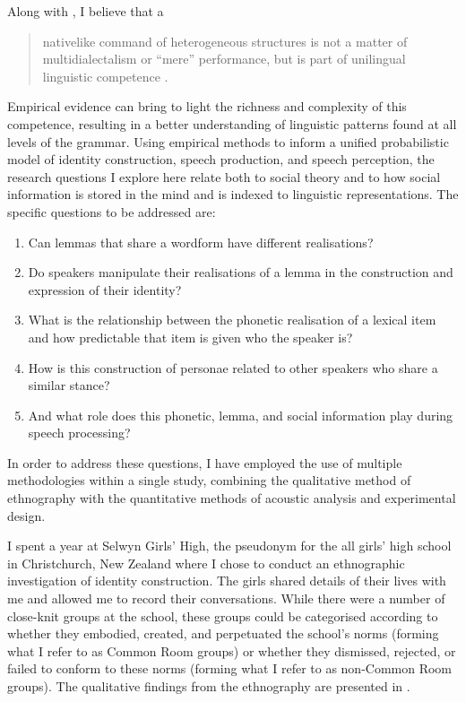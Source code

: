 Along with \citet{weinrichlabovherzog1968}, I believe that a

\begin{quote}
	nativelike command of heterogeneous structures is not a matter of multidialectalism or ``mere'' performance, but is part of unilingual linguistic competence \citep[101]{weinrichlabovherzog1968}.
\end{quote}

\noindent Empirical evidence can bring to light the richness and complexity of this competence, resulting in a better understanding of linguistic patterns found at all levels of the grammar. Using empirical methods to inform a unified probabilistic model of identity construction, speech production, and speech perception, the research questions I explore here relate both to social theory and to how social information is stored in the mind and is indexed to linguistic representations. The specific questions to be addressed are:

\begin{enumerate}
	\item Can lemmas that share a wordform have different realisations? 
	\item Do speakers manipulate their realisations of a lemma in the construction and expression of their identity? 
	\item What is the relationship between the phonetic realisation of a lexical item and how predictable that item is given who the speaker is?
	\item How is this construction of personae related to other speakers who share a similar stance?
	\item And what role does this phonetic, lemma, and social information play during speech processing?  
\end{enumerate}

\noindent In order to address these questions, I have employed the use of multiple methodologies within a single study, combining the qualitative method of ethnography with the quantitative methods of acoustic analysis and experimental design. 

I spent a year at Selwyn Girls' High, the pseudonym for the all girls' high school in Christchurch, New Zealand where I chose to conduct an ethnographic investigation of identity construction. The girls shared details of their lives with me and allowed me to record their conversations. While there were a number of close-knit groups at the school, these groups could be categorised according to whether they embodied, created, and perpetuated the school's norms (forming what I refer to as Common Room groups) or whether they dismissed, rejected, or failed to conform to these norms (forming what I refer to as non-Common Room groups). The qualitative findings from the ethnography are presented in .

